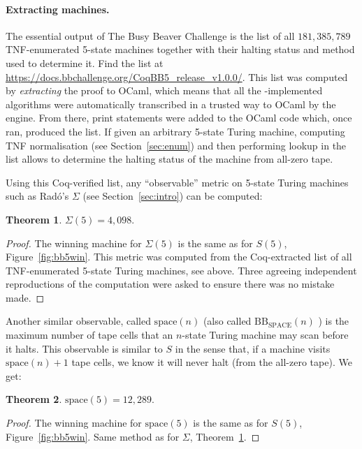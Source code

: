 \documentclass[sigconf,screen]{acmart}
\theoremstyle{definition} %
\newtheorem{theorem}{Theorem}[section]
\numberwithin{equation}{section}
\theoremstyle{definition} %
\newcommand{\BBtheFifthTNF}{181{,}385{,}789}
\newcommand{\rado}{Rad\'o\xspace}
\begin{document}
\paragraph{Extracting machines.} The essential output of The Busy Beaver Challenge is the list of all $\BBtheFifthTNF$ TNF-enumerated 5-state machines together with their halting status and method used to determine it. Find the list at \url{https://docs.bbchallenge.org/CoqBB5_release_v1.0.0/}. This list was computed by \textit{extracting} the \Coq proof to OCaml, which means that all the \Coq-implemented algorithms were automatically transcribed  in a trusted way to OCaml by the \Coq engine. From there, print statements were added to the OCaml code which, once ran, produced the list. If given an arbitrary 5-state Turing machine, computing TNF normalisation (see Section~\ref{sec:enum}) and then performing lookup in the list allows to determine the halting status of the machine from all-zero tape.

Using this Coq-verified list, any ``observable'' metric on 5-state Turing machines such as \rado's $\Sigma$ (see Section~\ref{sec:intro}) can be computed:

\begin{theorem}\label{th:Sigma5}
    $\Sigma(5) = 4{,}098$.
\end{theorem}
\begin{proof}
    The winning machine for $\Sigma(5)$ is the same as for $S(5)$, Figure~\ref{fig:bb5win}.
    This metric was computed from the Coq-extracted list of all TNF-enumerated 5-state Turing machines, see above. Three agreeing independent reproductions of the computation were asked to ensure there was no mistake made.
\end{proof}

Another similar observable, called $\text{space}(n)$ \cite{Ben-Amram1996} (also called $\text{BB}_{\text{SPACE}}(n)$ \cite{sterin_2022_14955828}) is the maximum number of tape cells that an $n$-state Turing machine may scan before it halts. This observable is similar to $S$ in the sense that, if a machine visits $\text{space}(n)+1$ tape cells, we know it will never halt (from the all-zero tape). We get:

\begin{theorem}
    $\text{space}(5) = 12{,}289$.
\end{theorem}
\begin{proof}
    The winning machine for $\text{space}(5)$ is the same as for $S(5)$, Figure~\ref{fig:bb5win}.
    Same method as for $\Sigma$, Theorem~\ref{th:Sigma5}.
\end{proof}
\end{document}
